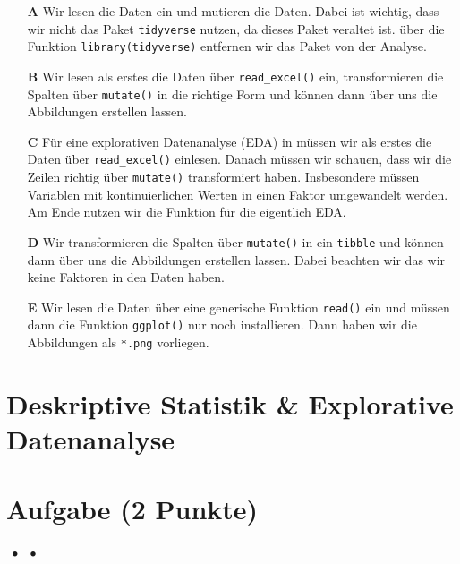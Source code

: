 \documentclass[a4paper, 9pt]{scrartcl}\usepackage[]{graphicx}\usepackage[]{xcolor}
\begin{document}
\begin{enumerate}
\item [\textbf{A} \msquare] Wir lesen die Daten ein und mutieren die Daten. Dabei ist wichtig, dass wir nicht das Paket \texttt{tidyverse} nutzen, da dieses Paket veraltet ist. über die Funktion \texttt{library(tidyverse)} entfernen wir das Paket von der Analyse.
\item [\textbf{B} \msquare] Wir lesen als erstes die Daten über \texttt{read\_excel()} ein, transformieren die Spalten über \texttt{mutate()} in die richtige Form und können dann über  uns die Abbildungen erstellen lassen.
\item [\textbf{C} \msquare] Für eine explorativen Datenanalyse (EDA) in \Rlogo müssen wir als erstes die Daten über \texttt{read\_excel()} einlesen. Danach müssen wir schauen, dass wir die Zeilen richtig über \texttt{mutate()} transformiert haben. Insbesondere müssen Variablen mit kontinuierlichen Werten in einen Faktor umgewandelt werden. Am Ende nutzen wir die Funktion  für die eigentlich EDA.
\item [\textbf{D} \msquare] Wir transformieren die Spalten über \texttt{mutate()} in ein \texttt{tibble} und können dann über  uns die Abbildungen erstellen lassen. Dabei beachten wir das wir keine Faktoren in den Daten haben.
\item [\textbf{E} \msquare] Wir lesen die Daten über eine generische Funktion \texttt{read()} ein und müssen dann die Funktion \texttt{ggplot()} nur noch installieren. Dann haben wir die Abbildungen als \texttt{*.png} vorliegen.
\end{enumerate} 
\section*{Deskriptive Statistik \& Explorative Datenanalyse}

\section{Aufgabe \hfill (2 Punkte)}

\ifcollection
\begin{flushright}
\tiny\vspace{-2Ex}
\textbf{\examinhaltstart}
\exammodulemathstat $\;\bullet$
\exammodulestat $\;\bullet$
\exammodulestatbbv 
\vspace{-1Ex}
\end{flushright}
\fi
\end{document}
